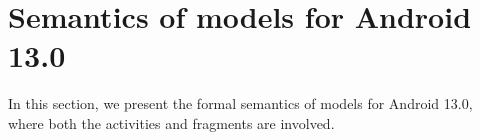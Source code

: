 \section{Semantics of {\AMASS} models for Android 13.0} \label{app:semantic}

In this section, we present the formal semantics of {\AMASS} models for Android 13.0, where both the activities and fragments are involved. 





